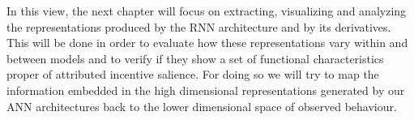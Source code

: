 In this view, the next chapter will focus on extracting, visualizing and analyzing the representations produced by the RNN architecture and by its derivatives. This will be done in order to evaluate how these representations vary within and between models and to verify if they show a set of functional characteristics proper of attributed incentive salience. For doing so we will try to map the information embedded in the high dimensional representations generated by our ANN architectures back to the lower dimensional space of observed behaviour. 
